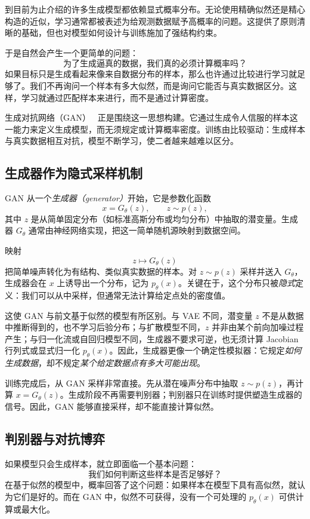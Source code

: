 到目前为止介绍的许多生成模型都依赖显式概率分布。无论使用精确似然还是精心构造的近似，学习通常都被表述为给观测数据赋予高概率的问题。这提供了原则清晰的基础，但也对模型如何设计与训练施加了强结构约束。

于是自然会产生一个更简单的问题：
\[
\textit{为了生成逼真的数据，我们真的必须计算概率吗？}
\]
如果目标只是生成看起来像来自数据分布的样本，那么也许通过比较进行学习就足够了。我们不再询问一个样本有多大似然，而是询问它能否与真实数据区分。这样，学习就通过匹配样本来进行，而不是通过计算密度。

生成对抗网络（GAN）~\cite{goodfellow2014generative} 正是围绕这一思想构建。它通过生成令人信服的样本这一能力来定义生成模型，而无须规定或计算概率密度。训练由比较驱动：生成样本与真实数据相互对抗，模型不断学习，使二者越来越难以区分。

\subsection{生成器作为隐式采样机制}

GAN 从一个\emph{生成器（generator）}开始，它是参数化函数
\[
x = G_\theta(z),
\qquad z \sim p(z),
\]
其中 $z$ 是从简单固定分布（如标准高斯分布或均匀分布）中抽取的潜变量。生成器 $G_\theta$ 通常由神经网络实现，把这一简单随机源映射到数据空间。

映射
\[
z \longmapsto G_\theta(z)
\]
把简单噪声转化为有结构、类似真实数据的样本。对 $z\sim p(z)$ 采样并送入 $G_\theta$，生成器会在 $x$ 上诱导出一个分布，记为 $p_\theta(x)$。关键在于，这个分布只被\emph{隐式}定义：我们可以从中采样，但通常无法计算给定点处的密度值。

这使 GAN 与前文基于似然的模型有所区别。与 VAE 不同，潜变量 $z$ 不是从数据中推断得到的，也不学习后验分布；与扩散模型不同，$z$ 并非由某个前向加噪过程产生；与归一化流或自回归模型不同，生成器不要求可逆，也无须计算 Jacobian 行列式或显式归一化 $p_\theta(x)$。因此，生成器更像一个确定性模拟器：它规定\emph{如何生成数据}，却不规定\emph{某个给定数据点有多大可能出现}。

训练完成后，从 GAN 采样非常直接。先从潜在噪声分布中抽取 $z\sim p(z)$，再计算 $x=G_\theta(z)$。生成阶段不再需要判别器；判别器只在训练时提供塑造生成器的信号。因此，GAN 能够直接采样，却不能直接计算似然。

\subsection{判别器与对抗博弈}

如果模型只会生成样本，就立即面临一个基本问题：
\[
\textit{我们如何判断这些样本是否足够好？}
\]
在基于似然的模型中，概率回答了这个问题：如果样本在模型下具有高似然，就认为它们是好的。而在 GAN 中，似然不可获得，没有一个可处理的 $p_\theta(x)$ 可供计算或最大化。


